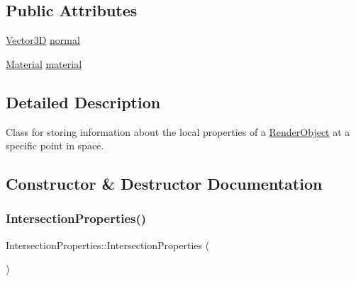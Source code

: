 \subsection*{Public Attributes}
\begin{DoxyCompactItemize}
\item 
\mbox{\hyperlink{classVector3D}{Vector3D}} \mbox{\hyperlink{classIntersectionProperties_afb99c699b3116580c68936d033b09081}{normal}}
\item 
\mbox{\hyperlink{classMaterial}{Material}} \mbox{\hyperlink{classIntersectionProperties_a52218ae741a9cd035eeed6cbc40b3300}{material}}
\end{DoxyCompactItemize}


\subsection{Detailed Description}
Class for storing information about the local properties of a \mbox{\hyperlink{classRenderObject}{Render\+Object}} at a specific point in space. 

\subsection{Constructor \& Destructor Documentation}
\mbox{\label{classIntersectionProperties_af6f71f18a350a95cfab225d5f13be280}} 
\subsubsection{\texorpdfstring{IntersectionProperties()}{IntersectionProperties()}\hspace{0.1cm}{\footnotesize\ttfamily [1/2]}}
{\footnotesize\ttfamily Intersection\+Properties\+::\+Intersection\+Properties (\begin{DoxyParamCaption}{ }\end{DoxyParamCaption})\hspace{0.3cm}{\ttfamily [default]}}

\mbox{\label{classIntersectionProperties_a375cfefda4657bdc278504213347bde8}} 
